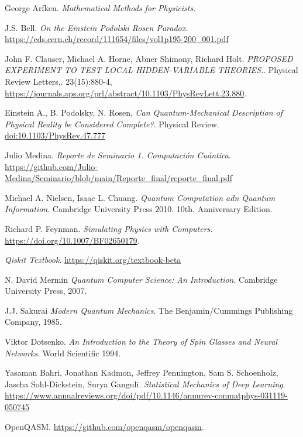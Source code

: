 \documentclass[a4paper]{article}
\begin{document}
\begin{thebibliography}{99}
 George Arfken. \textit{Mathematical Methods for Physicists}.

 J.S. Bell. \textit{On the Einstein Podolski Rosen Paradox}. \url{https://cds.cern.ch/record/111654/files/vol1p195-200_001.pdf}

 John F. Clauser, Michael A. Horne, Abner Shimony, Richard Holt. \textit{PROPOSED EXPERIMENT TO TEST LOCAL HIDDEN-VARIABLE THEORIES.}. Physical Review Letters,. 23(15):880-4, \url{https://journals.aps.org/prl/abstract/10.1103/PhysRevLett.23.880}.

 Einstein A., B. Podolsky, N. Rosen, \textit{Can Quantum-Mechanical Description of Physical Reality be Considered Complete?}. Physical Review. \url{doi:10.1103/PhysRev.47.777}

 Julio Medina. \textit{Reporte de Seminario 1. Computación Cuántica}. \url{https://github.com/Julio-Medina/Seminario/blob/main/Reporte_final/reporte_final.pdf}

 Michael A. Nielsen, Isaac L. Chuang. \textit{Quantum Computation adn Quantum Information}. Cambridge University Press 2010. 10th. Anniversary Edition.

 Richard P. Feynman. \textit{Simulating Physics with Computers.} \url{https://doi.org/10.1007/BF02650179}.

 \textit{Qiskit Textbook}. \url{https://qiskit.org/textbook-beta}

 N. David Mermin \textit{Quantum Computer Science: An Introduction}. Cambridge University Press, 2007.

 J.J. Sakurai \textit{Modern Quantum Mechanics}. The Benjamin/Cummings Publishing Company, 1985.

 Viktor Dotsenko. \textit{An Introduction to the Theory of Spin Glasses and Neural Networks}. World Scientific 1994.

 Yasaman Bahri, Jonathan Kadmon, Jeffrey Pennington, Sam S. Schoenholz, Jascha Sohl-Dickstein, Surya Ganguli. \textit{Statistical Mechanics of Deep Learning}. \url{https://www.annualreviews.org/doi/pdf/10.1146/annurev-conmatphys-031119-050745}

 OpenQASM. \url{https://github.com/openqasm/openqasm}.
 

\end{thebibliography}
\end{document}
